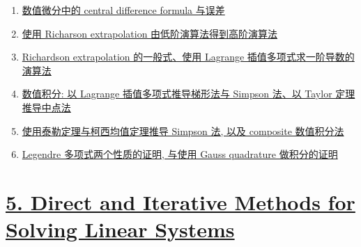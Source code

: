 \documentclass[11pt]{article}
\begin{document}
\begin{enumerate}
	\item \href{https://mp.weixin.qq.com/s/j52k12G3aPAPHHsvUKhNDQ}{数值微分中的 central difference formula 与误差} %
	\item \href{https://mp.weixin.qq.com/s/3TYsTAwIHfKJ2fFQh9dZOA}{使用 Richarson extrapolation 由低阶演算法得到高阶演算法} %
	\item \href{https://mp.weixin.qq.com/s/7DRpu8YgUsOpr7GIo0ci1g}{Richardson extrapolation 的一般式、使用 Lagrange 插值多项式求一阶导数的演算法} %
	\item \href{https://mp.weixin.qq.com/s/Q8IIc3Bvh67NRjlYBJ9SrQ}{数值积分: 以 Lagrange 插值多项式推导梯形法与 Simpson 法、以 Taylor 定理推导中点法} %
	\item \href{https://mp.weixin.qq.com/s/MXBhKAsO7hfMbqCpacJQ5g}{使用泰勒定理与柯西均值定理推导 Simpson 法, 以及 composite 数值积分法} %
	\item \href{https://mp.weixin.qq.com/s/p0FYIQoVicf9VPa5OZ5prg}{Legendre 多项式两个性质的证明, 与使用 Gauss quadrature 做积分的证明} %
\end{enumerate}

\vspace{-1cm}

\section*{\href{https://www.youtube.com/playlist?list=PLGwoNNTgFGehnDSyUWtPPXhe-awbm-hz8}{5. Direct and Iterative Methods for Solving Linear Systems}} %

\vspace{-0.5cm}
\end{document}
